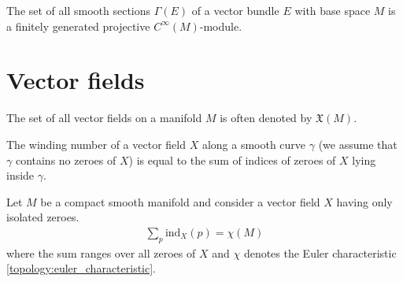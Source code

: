     \begin{theorem}\label{diff:serre_swan}
        The set of all smooth sections $\Gamma(E)$ of a vector bundle $E$ with base space $M$ is a finitely generated projective $C^\infty(M)$-module.
    \end{theorem}

\section{Vector fields}

    \begin{notation}
        The set of all vector fields on a manifold $M$ is often denoted by $\mathfrak{X}(M)$.
    \end{notation}

    \begin{property}
        The winding number of a vector field $X$ along a smooth curve $\gamma$ (we assume that $\gamma$ contains no zeroes of $X$) is equal to the sum of indices of zeroes of $X$ lying inside $\gamma$.
    \end{property}

    \begin{theorem}
        Let $M$ be a compact smooth manifold and consider a vector field $X$ having only isolated zeroes.
        \begin{gather}
            \sum_p\text{ind}_X(p) = \chi(M)
        \end{gather}
        where the sum ranges over all zeroes of $X$ and $\chi$ denotes the Euler characteristic \ref{topology:euler_characteristic}.
    \end{theorem}

